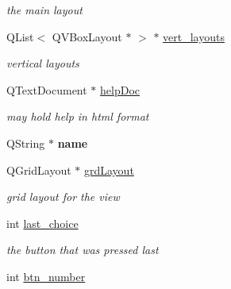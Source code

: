\begin{CompactItemize}
\begin{CompactList}\small\item\em the main layout \item\end{CompactList}\item 
\hypertarget{classinterface__view_0bf68665628d3fa3be39c3558b7bcfee}{
QList$<$ QVBoxLayout $\ast$ $>$ $\ast$ \hyperlink{classinterface__view_0bf68665628d3fa3be39c3558b7bcfee}{vert\_\-layouts}}
\label{classinterface__view_0bf68665628d3fa3be39c3558b7bcfee}

\begin{CompactList}\small\item\em vertical layouts \item\end{CompactList}\item 
\hypertarget{classinterface__view_067249953209457785a5c60f72658454}{
QTextDocument $\ast$ \hyperlink{classinterface__view_067249953209457785a5c60f72658454}{helpDoc}}
\label{classinterface__view_067249953209457785a5c60f72658454}

\begin{CompactList}\small\item\em may hold help in html format \item\end{CompactList}\item 
\hypertarget{classinterface__view_caa36380bb9690e725dfff36c86ea6b3}{
QString $\ast$ \textbf{name}}
\label{classinterface__view_caa36380bb9690e725dfff36c86ea6b3}

\item 
\hypertarget{classinterface__view_6e37fda00c60793f253f9c0382a212ba}{
QGridLayout $\ast$ \hyperlink{classinterface__view_6e37fda00c60793f253f9c0382a212ba}{grdLayout}}
\label{classinterface__view_6e37fda00c60793f253f9c0382a212ba}

\begin{CompactList}\small\item\em grid layout for the view \item\end{CompactList}\item 
\hypertarget{classinterface__view_42b38fa9abe0847a6c90612bbc91172d}{
int \hyperlink{classinterface__view_42b38fa9abe0847a6c90612bbc91172d}{last\_\-choice}}
\label{classinterface__view_42b38fa9abe0847a6c90612bbc91172d}

\begin{CompactList}\small\item\em the button that was pressed last \item\end{CompactList}\item 
\hypertarget{classinterface__view_5fc137482a8945bd8dc310357247a2bb}{
int \hyperlink{classinterface__view_5fc137482a8945bd8dc310357247a2bb}{btn\_\-number}}
\label{classinterface__view_5fc137482a8945bd8dc310357247a2bb}


\end{CompactItemize}
